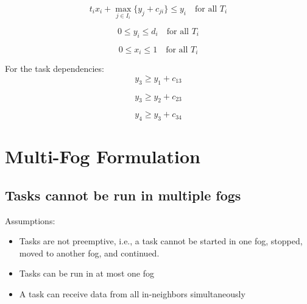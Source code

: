 \documentclass{article}
\begin{document}
\begin{equation}
    t_i x_i + \max_{j \in I_i} \{y_j + c_{ji}\} \leq y_i \quad \text{for all } T_i
\end{equation}

\begin{equation}
    0 \leq y_i \leq d_i \quad \text{for all } T_i
\end{equation}

\begin{equation}
    0 \leq x_i \leq 1 \quad \text{for all } T_i
\end{equation}

For the task dependencies:
\begin{equation}
    y_3 \geq y_1 + c_{13}
\end{equation}

\begin{equation}
    y_3 \geq y_2 + c_{23}
\end{equation}

\begin{equation}
    y_4 \geq y_3 + c_{34}
\end{equation}


\section{Multi-Fog Formulation}
\subsection{Tasks cannot be run in multiple fogs}
Assumptions: 
\begin{itemize}
    \item Tasks are not preemptive, i.e., a task cannot be started in one fog, stopped, moved to another fog, and continued.
    \item Tasks can be run in at most one fog
    \item A task can receive data from all in-neighbors simultaneously
\end{itemize}
\end{document}
